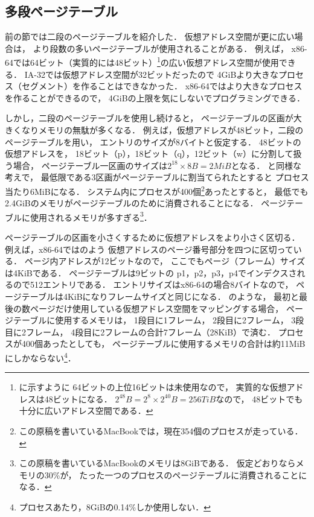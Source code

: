 \subsection{多段ページテーブル}
前の節では二段のページテーブルを紹介した．
仮想アドレス空間が更に広い場合は，
より段数の多いページテーブルが使用されることがある．
例えば，
x86-64では64ビット（実質的には48ビット）\footnote{
に示すように
64ビットの上位16ビットは未使用なので，
実質的な仮想アドレスは48ビットになる．
$2^{48}B = 2^8 \times 2^{40}B = 256TiB$なので，
48ビットでも十分に広いアドレス空間である．
}の広い仮想アドレス空間が使用できる．
IA-32では仮想アドレス空間が32ビットだったので
4GiBより大きなプロセス（セグメント）を作ることはできなかった．
x86-64ではより大きなプロセスを作ることができるので，
4GiBの上限を気にしないでプログラミングできる．

しかし，二段のページテーブルを使用し続けると，
ページテーブルの区画が大きくなりメモリの無駄が多くなる．
例えば，仮想アドレスが48ビット，二段のページテーブルを用い，
エントリのサイズが8バイトと仮定する．
48ビットの仮想アドレスを，
18ビット（p），18ビット（q），12ビット（w）に分割して扱う場合，
ページテーブル一区画のサイズは$2^{18} \times 8B = 2MiB$となる．
と同様な考えで，
最低限である3区画がページテーブルに割当てられたとすると
プロセス当たり6MiBになる．
システム内にプロセスが400個\footnote{
この原稿を書いているMacBookでは，現在354個のプロセスが走っている．
}あったとすると，
最低でも2.4GiBのメモリがページテーブルのために消費されることになる．
ページテーブルに使用されるメモリが多すぎる\footnote{
この原稿を書いているMacBookのメモリは8GiBである．
仮定どおりならメモリの30\%が，
たった一つのプロセスのページテーブルに消費されることになる．
}．

ページテーブルの区画を小さくするために仮想アドレスをより小さく区切る．
例えば，x86-64ではのよう
仮想アドレスのページ番号部分を四つに区切っている．
ページ内アドレスが12ビットなので，
ここでもページ（フレーム）サイズは4KiBである．
ページテーブルは9ビットの
p1，p2，p3，p4でインデクスされるので512エントリである．
エントリサイズはx86-64の場合8バイトなので，
ページテーブルは4KiBになりフレームサイズと同じになる．
のような，
最初と最後の数ページだけ使用している仮想アドレス空間をマッピングする場合，
ページテーブルに使用するメモリは，
1段目に1フレーム，
2段目に2フレーム，
3段目に2フレーム，
4段目に2フレームの合計7フレーム（28KiB）で済む．
プロセスが400個あったとしても，
ページテーブルに使用するメモリの合計は約11MiBにしかならない\footnote{
プロセスあたり，8GiBの0.14\%しか使用しない．}．

